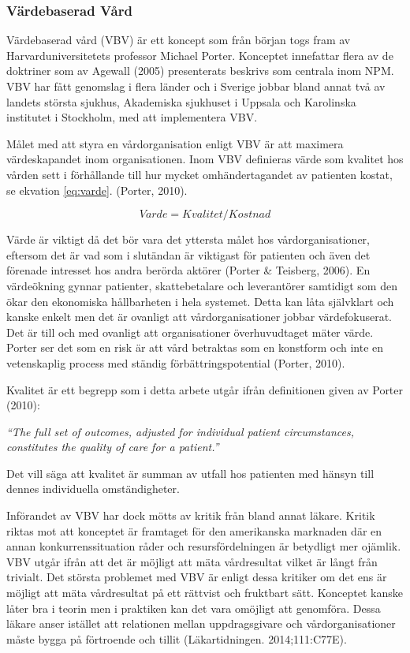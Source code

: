 \subsubsection{Värdebaserad Vård}

Värdebaserad vård (VBV) är ett koncept som från början togs fram av Harvarduniversitetets professor Michael Porter. Konceptet innefattar flera av de doktriner som av Agewall (2005) presenterats beskrivs som centrala inom NPM. VBV har fått genomslag i flera länder och i Sverige jobbar bland annat två av landets största sjukhus, Akademiska sjukhuset i Uppsala och Karolinska institutet i Stockholm, med att implementera VBV.
 
Målet med att styra en vårdorganisation enligt VBV är att maximera värdeskapandet inom organisationen. Inom VBV definieras värde som kvalitet hos vården sett i förhållande till hur mycket omhändertagandet av patienten kostat, se ekvation \ref{eq:varde}. (Porter, 2010).

\begin{equation}
\label{eq:varde}
	Varde = Kvalitet/Kostnad
\end{equation}

Värde är viktigt då det bör vara det yttersta målet hos vårdorganisationer, eftersom det är vad som i slutändan är viktigast för patienten och även det förenade intresset hos andra berörda aktörer (Porter \& Teisberg, 2006). En värdeökning gynnar patienter, skattebetalare och leverantörer samtidigt som den ökar den ekonomiska hållbarheten i hela systemet. Detta kan låta självklart och kanske enkelt men det är ovanligt att vårdorganisationer jobbar värdefokuserat. Det är till och med ovanligt att organisationer överhuvudtaget mäter värde. Porter ser det som en risk är att vård betraktas som en konstform och inte en vetenskaplig process med ständig förbättringspotential (Porter, 2010).
 
Kvalitet är ett begrepp som i detta arbete utgår ifrån definitionen given av Porter (2010):
 
\textit{“The full set of outcomes, adjusted for individual patient circumstances, constitutes the quality of care for a patient.”}
 
Det vill säga att kvalitet är summan av utfall hos patienten med hänsyn till dennes individuella omständigheter.
 
Införandet av VBV har dock mötts av kritik från bland annat läkare. Kritik riktas mot att konceptet är framtaget för den amerikanska marknaden där en annan konkurrenssituation råder och resursfördelningen är betydligt mer ojämlik. VBV utgår ifrån att det är möjligt att mäta vårdresultat vilket är långt från trivialt. Det största problemet med VBV är enligt dessa kritiker om det ens är möjligt att mäta vårdresultat på ett rättvist och fruktbart sätt. Konceptet kanske låter bra i teorin men i praktiken kan det vara omöjligt att genomföra. Dessa läkare anser istället att relationen mellan uppdragsgivare och vårdorganisationer måste bygga på förtroende och tillit (Läkartidningen. 2014;111:C77E). 


